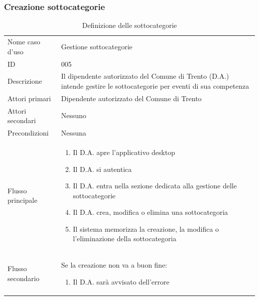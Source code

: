 \documentclass{article}
\begin{document}
\subsubsection{Creazione sottocategorie}

\begin{table}[htbp]
    \label{8.3.1}
    \centering
    \begin{tabularx}{\textwidth}{| l | p{} |}
        \Xhline{2pt} %
        Nome caso d'uso & Gestione sottocategorie \\
        \Xhline{2pt} %
        ID & 005 \\
        \hline
        Descrizione & Il dipendente autorizzato del Comune di Trento (D.A.) intende gestire le sottocategorie per eventi di sua competenza\\
        \hline
        Attori primari & Dipendente autorizzato del Comune di Trento\\
        \hline
        Attori secondari & Nessuno \\
        \hline
        Precondizioni & Nessuna \\
        \hline
        Flusso principale & 
        \begin{enumerate}[topsep=5pt,partopsep=0pt,parsep=0pt,itemsep=0pt,before=\vspace{-\baselineskip},after=\vspace{-\baselineskip}]                
            \item Il D.A. apre l'applicativo desktop
            \item Il D.A. si autentica
            \item Il D.A. entra nella sezione dedicata alla gestione delle sottocategorie
            \item Il D.A. crea, modifica o elimina una sottocategoria
            \item Il sistema memorizza la creazione, la modifica o l'eliminazione della sottocategoria
        \end{enumerate}
        \\
        \hline
        Flusso secondario & 
        Se la creazione non va a buon fine:
        \begin{enumerate}[topsep=10pt,partopsep=0pt,parsep=0pt,itemsep=0pt,before=\vspace{-\baselineskip},after=\vspace{-\baselineskip}]                
            \item Il D.A. sarà avvisato dell'errore
        \end{enumerate}
        \\
        \hline
    \end{tabularx}
    \caption{Definizione delle sottocategorie}
    \label{tab:tabella_use_case006}
\end{table}
\end{document}
